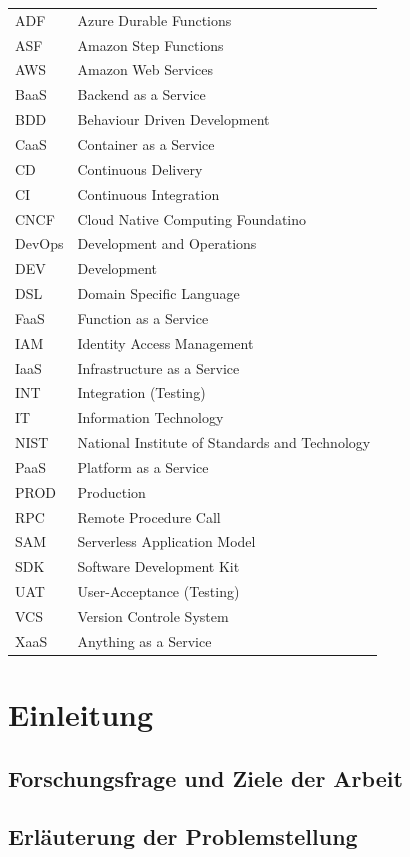 \documentclass[11pt]{article}
\begin{document}
\begin{tabular}{ p{2cm} p{10cm}} 
ADF & Azure Durable Functions \\
ASF & Amazon Step Functions \\
AWS & Amazon Web Services \\
BaaS & Backend as a Service \\
BDD & Behaviour Driven Development \\
CaaS & Container as a Service \\  
CD & Continuous Delivery \\  
CI & Continuous Integration \\
CNCF & Cloud Native Computing Foundatino \\
DevOps & Development and Operations \\  
DEV & Development \\
DSL & Domain Specific Language \\
FaaS & Function as a Service \\ 
IAM & Identity Access Management \\
IaaS & Infrastructure as a Service \\
INT & Integration (Testing) \\
IT & Information Technology \\
NIST & National Institute of Standards and Technology\\
PaaS & Platform as a Service \\
PROD & Production \\
RPC & Remote Procedure Call \\
SAM & Serverless Application Model \\
SDK & Software Development Kit \\
UAT & User-Acceptance (Testing) \\
VCS & Version Controle System \\
XaaS & Anything as a Service \\
 
\end{tabular}
\newpage
\tableofcontents
\newpage
\section{Einleitung}
\subsection{Forschungsfrage und Ziele der Arbeit}
\subsection{Erläuterung der Problemstellung}
\end{document}
